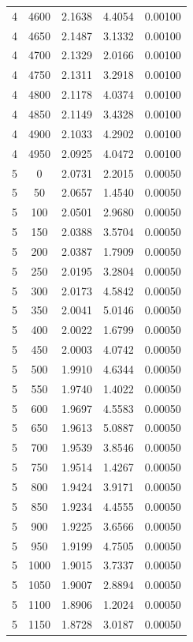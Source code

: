 \begin{longtable}{ccccc}
    4 & 4600 & 2.1638 & 4.4054 & 0.00100 \\
    4 & 4650 & 2.1487 & 3.1332 & 0.00100 \\
    4 & 4700 & 2.1329 & 2.0166 & 0.00100 \\
    4 & 4750 & 2.1311 & 3.2918 & 0.00100 \\
    4 & 4800 & 2.1178 & 4.0374 & 0.00100 \\
    4 & 4850 & 2.1149 & 3.4328 & 0.00100 \\
    4 & 4900 & 2.1033 & 4.2902 & 0.00100 \\
    4 & 4950 & 2.0925 & 4.0472 & 0.00100 \\
    5 & 0 & 2.0731 & 2.2015 & 0.00050 \\
    5 & 50 & 2.0657 & 1.4540 & 0.00050 \\
    5 & 100 & 2.0501 & 2.9680 & 0.00050 \\
    5 & 150 & 2.0388 & 3.5704 & 0.00050 \\
    5 & 200 & 2.0387 & 1.7909 & 0.00050 \\
    5 & 250 & 2.0195 & 3.2804 & 0.00050 \\
    5 & 300 & 2.0173 & 4.5842 & 0.00050 \\
    5 & 350 & 2.0041 & 5.0146 & 0.00050 \\
    5 & 400 & 2.0022 & 1.6799 & 0.00050 \\
    5 & 450 & 2.0003 & 4.0742 & 0.00050 \\
    5 & 500 & 1.9910 & 4.6344 & 0.00050 \\
    5 & 550 & 1.9740 & 1.4022 & 0.00050 \\
    5 & 600 & 1.9697 & 4.5583 & 0.00050 \\
    5 & 650 & 1.9613 & 5.0887 & 0.00050 \\
    5 & 700 & 1.9539 & 3.8546 & 0.00050 \\
    5 & 750 & 1.9514 & 1.4267 & 0.00050 \\
    5 & 800 & 1.9424 & 3.9171 & 0.00050 \\
    5 & 850 & 1.9234 & 4.4555 & 0.00050 \\
    5 & 900 & 1.9225 & 3.6566 & 0.00050 \\
    5 & 950 & 1.9199 & 4.7505 & 0.00050 \\
    5 & 1000 & 1.9015 & 3.7337 & 0.00050 \\
    5 & 1050 & 1.9007 & 2.8894 & 0.00050 \\
    5 & 1100 & 1.8906 & 1.2024 & 0.00050 \\
    5 & 1150 & 1.8728 & 3.0187 & 0.00050 \\

\end{longtable}
